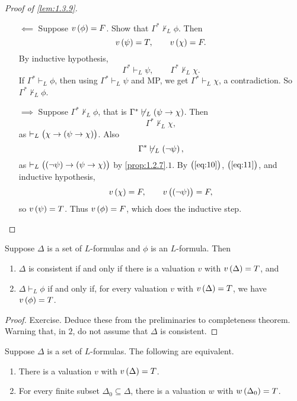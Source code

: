 \begin{proof}[Proof of \ref{lem:1.3.9}]
\begin{itemize}
\begin{enumerate}[leftmargin=0.5in, label=Case \arabic*.]
\begin{itemize}
\item[$ \impliedby $] Suppose $ v\br{\phi} = F $. Show that $ \Gamma^* \not\vdash_L \phi $. Then
$$ v\br{\psi} = T, \qquad v\br{\chi} = F. $$
By inductive hypothesis,
$$ \Gamma^* \vdash_L \psi, \qquad \Gamma^* \not\vdash_L \chi. $$
If $ \Gamma^* \vdash_L \phi $, then using $ \Gamma^* \vdash_L \psi $ and MP, we get $ \Gamma^* \vdash_L \chi $, a contradiction. So $ \Gamma^* \not\vdash_L \phi $.
\item[$ \implies $] Suppose $ \Gamma^* \not\vdash_L \phi $, that is $ \Gamma^* \not\vdash_L \impb{\psi}{\chi} $. Then
\begin{equation}
\label{eq:10}
\Gamma^* \not\vdash_L \chi,
\end{equation}
as $ \vdash_L \impb{\chi}{\impb{\psi}{\chi}} $. Also
\begin{equation}
\label{eq:11}
\Gamma^* \not\vdash_L \notb{\psi},
\end{equation}
as $ \vdash_L \impb{\notb{\psi}}{\impb{\psi}{\chi}} $ by \ref{prop:1.2.7}.$ 1 $. By $ \br{\ref{eq:10}} $, $ \br{\ref{eq:11}} $, and inductive hypothesis,
$$ v\br{\chi} = F, \qquad v\br{\notb{\psi}} = F, $$
so $ v\br{\psi} = T $. Thus $ v\br{\phi} = F $, which does the inductive step.
\end{itemize}
\end{enumerate}
\end{itemize}
\end{proof}

\begin{corollary}
\label{cor:1.3.11}
Suppose $ \Delta $ is a set of $ L $-formulas and $ \phi $ is an $ L $-formula. Then
\begin{enumerate}
\item $ \Delta $ is consistent if and only if there is a valuation $ v $ with $ v\br{\Delta} = T $, and
\item $ \Delta \vdash_L \phi $ if and only if, for every valuation $ v $ with $ v\br{\Delta} = T $, we have $ v\br{\phi} = T $.
\end{enumerate}
\end{corollary}

\begin{proof}
Exercise. Deduce these from the preliminaries to completeness theorem. Warning that, in $ 2 $, do not assume that $ \Delta $ is consistent.
\end{proof}

\begin{theorem}
Suppose $ \Delta $ is a set of $ L $-formulas. The following are equivalent.
\begin{enumerate}
\item There is a valuation $ v $ with $ v\br{\Delta} = T $.
\item For every finite subset $ \Delta_0 \subseteq \Delta $, there is a valuation $ w $ with $ w\br{\Delta_0} = T $.
\end{enumerate}
\end{theorem}

